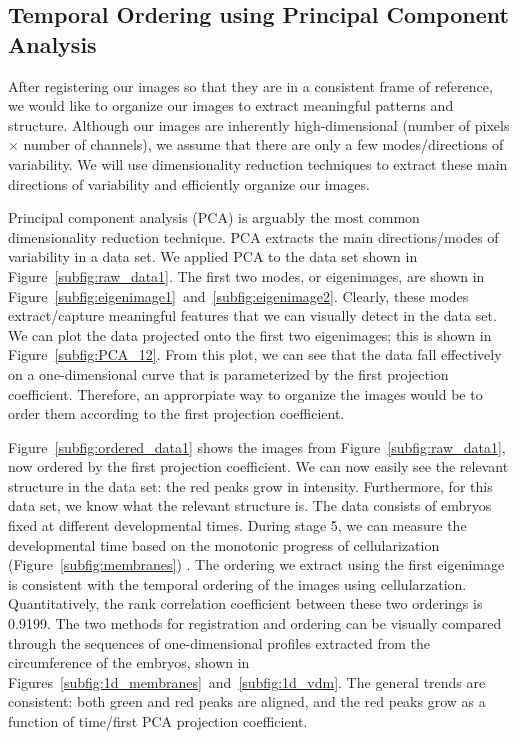 \documentclass{pnastwo}
\begin{document}
\begin{article}
\subsection{Temporal Ordering using Principal Component Analysis}



After registering our images so that they are in a consistent frame of reference, we would like to organize our images to extract meaningful patterns and structure. 
%
Although our images are inherently high-dimensional (number of pixels $\times$ number of channels), we assume that there are only a few modes/directions of variability.
%
We will use dimensionality reduction techniques to extract these main directions of variability and efficiently organize our images.
%
%

Principal component analysis (PCA) \cite{shlens2005tutorial} is arguably the most common dimensionality reduction technique.
%
PCA extracts the main directions/modes of variability in a data set. 
%
We applied PCA to the data set shown in Figure~\ref{subfig:raw_data1}.
%
The first two modes, or eigenimages, are shown in Figure~\ref{subfig:eigenimage1}~and~\ref{subfig:eigenimage2}.
%
Clearly, these modes extract/capture meaningful features that we can visually detect in the data set. 
%
We can plot the data projected onto the first two eigenimages; this is shown in Figure~\ref{subfig:PCA_12}.
%
From this plot, we can see that the data fall effectively on a one-dimensional curve that is parameterized by the first projection coefficient.
%
Therefore, an approrpiate way to organize the images would be to order them according to the first projection coefficient. 

Figure~\ref{subfig:ordered_data1} shows the images from Figure~\ref{subfig:raw_data1}, now ordered by the first projection coefficient.
%
We can now easily see the relevant structure in the data set:
the red peaks grow in intensity.
%
Furthermore, for this data set, we know what the relevant structure is.
%
The data consists of embryos fixed at different developmental times. 
%
During stage 5, we can measure the developmental time based on the monotonic progress of cellularization (Figure~\ref{subfig:membranes}) \cite{figard2013plasma}.%
%
The ordering we extract using the first eigenimage is consistent with the temporal ordering of the images using cellularzation.
%
Quantitatively, the rank correlation coefficient between these two orderings is 0.9199.
%
The two methods for registration and ordering can be visually compared through the sequences of one-dimensional profiles extracted from the circumference of the embryos, shown in Figures~\ref{subfig:1d_membranes}~and~\ref{subfig:1d_vdm}.
%
The general trends are consistent:
both green  and red peaks are aligned, and the red peaks grow as a function of time/first PCA projection coefficient.


\end{article}
\end{document}
